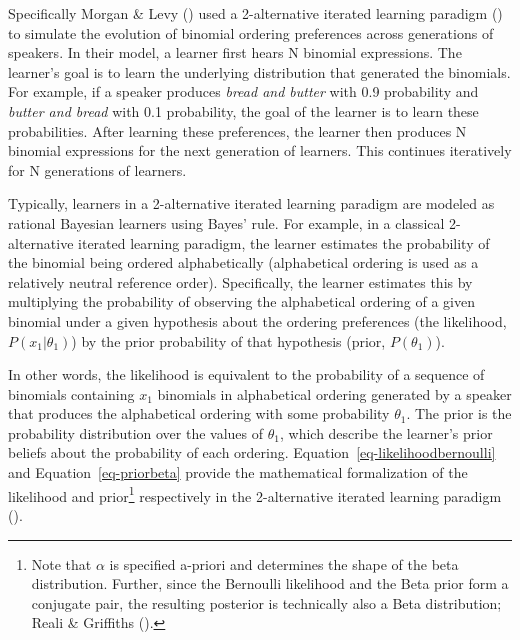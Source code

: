 \documentclass[
  12pt,
]{scrartcl}
\begin{document}
Specifically Morgan \& Levy
()
used a 2-alternative iterated learning paradigm
() to simulate the evolution of binomial ordering
preferences across generations of speakers. In their model, a learner
first hears N binomial expressions. The learner's goal is to learn the
underlying distribution that generated the binomials. For example, if a
speaker produces \emph{bread and butter} with 0.9 probability and
\emph{butter and bread} with 0.1 probability, the goal of the learner is
to learn these probabilities. After learning these preferences, the
learner then produces N binomial expressions for the next generation of
learners. This continues iteratively for N generations of learners.

Typically, learners in a 2-alternative iterated learning paradigm are
modeled as rational Bayesian learners using Bayes' rule. For example, in
a classical 2-alternative iterated learning paradigm, the learner
estimates the probability of the binomial being ordered alphabetically
(alphabetical ordering is used as a relatively neutral reference order).
Specifically, the learner estimates this by multiplying the probability
of observing the alphabetical ordering of a given binomial under a given
hypothesis about the ordering preferences (the likelihood,
\(P(x_1|\theta_1)\)) by the prior probability of that hypothesis (prior,
\(P(\theta_1)\)).

In other words, the likelihood is equivalent to the probability of a
sequence of binomials containing \(x_1\) binomials in alphabetical
ordering generated by a speaker that produces the alphabetical ordering
with some probability \(\theta_1\). The prior is the probability
distribution over the values of \(\theta_1\), which describe the
learner's prior beliefs about the probability of each ordering.
Equation~\ref{eq-likelihoodbernoulli} and Equation~\ref{eq-priorbeta}
provide the mathematical formalization of the likelihood and
prior\footnote{Note that \(\alpha\) is specified a-priori and determines
  the shape of the beta distribution. Further, since the Bernoulli
  likelihood and the Beta prior form a conjugate pair, the resulting
  posterior is technically also a Beta distribution; Reali \& Griffiths
  ().}
respectively in the 2-alternative iterated learning paradigm
().
\end{document}
